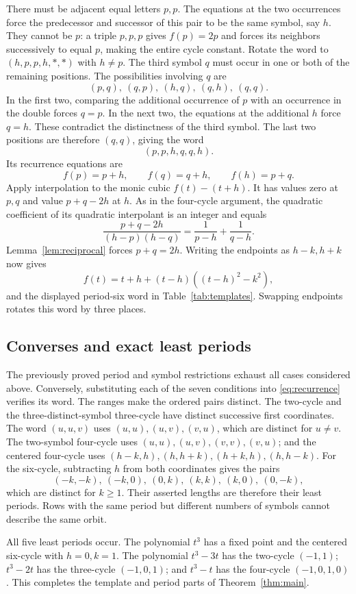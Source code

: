 There must be adjacent equal letters $p,p$. The equations at the
two occurrences force the predecessor and successor of this pair
to be the same symbol, say $h$. They cannot be $p$: a triple
$p,p,p$ gives $f(p)=2p$ and forces its neighbors successively to
equal $p$, making the entire cycle constant. Rotate the word to
$(h,p,p,h,*,*)$ with $h\ne p$.
The third symbol $q$ must occur in one or both of the remaining
positions. The possibilities involving $q$ are
\[
 (p,q),\ (q,p),\ (h,q),\ (q,h),\ (q,q).
\]
In the first two, comparing the additional occurrence of $p$ with
an occurrence in the double forces $q=p$. In the next two, the
equations at the additional $h$ force $q=h$. These contradict
the distinctness of the third symbol. The last two positions
are therefore $(q,q)$, giving the word
\[
 (p,p,h,q,q,h).
\]
Its recurrence equations are
\[
 f(p)=p+h,\qquad f(q)=q+h,\qquad f(h)=p+q.
\]
Apply interpolation to the monic cubic $f(t)-(t+h)$. It has
values zero at $p,q$ and value $p+q-2h$ at $h$.
As in the four-cycle argument, the quadratic coefficient of its
quadratic interpolant is an integer and equals
\[
 \frac{p+q-2h}{(h-p)(h-q)}
 =\frac1{p-h}+\frac1{q-h}.
\]
Lemma~\ref{lem:reciprocal} forces $p+q=2h$.
Writing the endpoints as $h-k,h+k$ now gives
\[
 f(t)=t+h+(t-h)((t-h)^2-k^2),
\]
and the displayed period-six word in Table~\ref{tab:templates}.
Swapping endpoints rotates this word by three places.

\subsection{Converses and exact least periods}

The previously proved period and symbol restrictions exhaust all
cases considered above. Conversely, substituting each of the seven
conditions into \eqref{eq:recurrence} verifies its word.
The ranges make the ordered pairs distinct. The two-cycle and the
three-distinct-symbol three-cycle have distinct successive first
coordinates. The word $(u,u,v)$ uses $(u,u),(u,v),(v,u)$,
which are distinct for $u\ne v$. The two-symbol four-cycle uses
$(u,u),(u,v),(v,v),(v,u)$; and the centered four-cycle uses
$(h-k,h),(h,h+k),(h+k,h),(h,h-k)$.
For the six-cycle, subtracting $h$ from both coordinates gives
the pairs
\[
 (-k,-k),\ (-k,0),\ (0,k),\
 (k,k),\ (k,0),\ (0,-k),
\]
which are distinct for $k\ge1$. Their asserted lengths are therefore
their least periods. Rows with the same period but different numbers
of symbols cannot describe the same orbit.

All five least periods occur. The polynomial $t^3$ has a fixed
point and the centered six-cycle with $h=0,k=1$.
The polynomial $t^3-3t$ has the two-cycle $(-1,1)$;
$t^3-2t$ has the three-cycle $(-1,0,1)$;
and $t^3-t$ has the four-cycle $(-1,0,1,0)$.
This completes the template and period parts of
Theorem~\ref{thm:main}.
